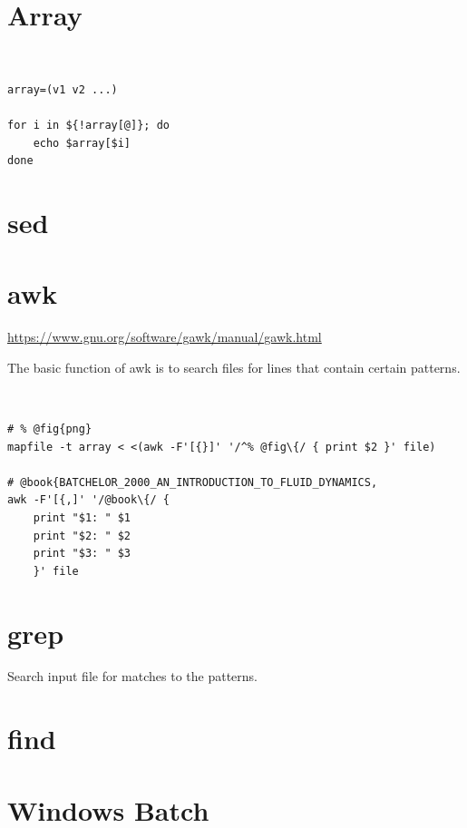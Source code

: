 \documentclass{article}
\begin{document}
\section{Array}
\begin{definition}[array]~
    \begin{verbatim}
array=(v1 v2 ...)

for i in ${!array[@]}; do
    echo $array[$i]
done
\end{verbatim}
\end{definition}

\section{sed}

\section{awk}
\url{https://www.gnu.org/software/gawk/manual/gawk.html}

\begin{definition}[awk]
    The basic function of awk is to search files for lines that contain certain patterns.
\end{definition}

\begin{example}~
    \begin{verbatim}
# % @fig{png}
mapfile -t array < <(awk -F'[{}]' '/^% @fig\{/ { print $2 }' file)

# @book{BATCHELOR_2000_AN_INTRODUCTION_TO_FLUID_DYNAMICS,
awk -F'[{,]' '/@book\{/ {
    print "$1: " $1
    print "$2: " $2
    print "$3: " $3
    }' file
\end{verbatim}
\end{example}

\section{grep}
\begin{definition}[grep]
    Search input file for matches to the patterns.
\end{definition}

\section{find}

\section{Windows Batch}
\end{document}

